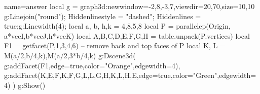 \documentclass{standalone}
\begin{document}
 \begin{luadraw}{name=answer}
local g = graph3d:new{window={-2,8,-3,7},viewdir={20,70},size={10,10}}
g:Linejoin("round"); Hiddenlinestyle = "dashed"; Hiddenlines = true;g:Linewidth(4);
local a, b, h,k = 4,8,5,8
local P = parallelep(Origin, a*vecI,b*vecJ,h*vecK)
local A,B,C,D,E,F,G,H = table.unpack(P.vertices)
local F1 = getfacet(P,{1,3,4,6}) -- remove back and top faces of P
local K, L = M(a/2,b/4,k),M(a/2,3*b/4,k) 
g:Dscene3d(
    g:addFacet(F1,{edge=true,color="Orange",edgewidth=4}),
    g:addFacet({{K,E,F},{K,F,G,L},{L,G,H},{K,L,H,E}},{edge=true,color="Green",edgewidth=4})
    )
g:Show()
\end{luadraw}
\end{document}

